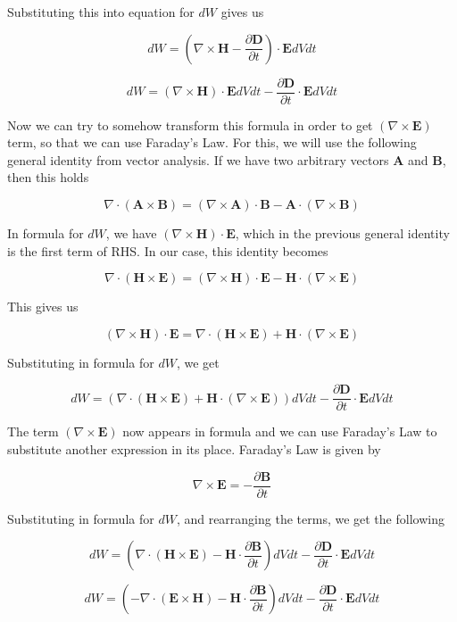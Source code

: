 \documentclass{article}
\begin{document}
Substituting this into equation for $dW$ gives us

\[ dW = (\nabla \times \mathbf{H} - \frac{\partial \mathbf{D}}{\partial t}) \cdot \mathbf{E} dVdt \]

\[ dW = (\nabla \times \mathbf{H}) \cdot \mathbf{E}dVdt - \frac{\partial \mathbf{D}}{\partial t} \cdot \mathbf{E}dVdt \]

Now we can try to somehow transform this formula in order to get $(\nabla \times \mathbf{E})$ term, so that we can use Faraday's Law. For this, we will use the following general identity from vector analysis. If we have two arbitrary vectors $\mathbf{A}$ and $\mathbf{B}$, then this holds

\[ \nabla \cdot (\mathbf{A} \times \mathbf{B}) = (\nabla \times \mathbf{A}) \cdot \mathbf{B} - \mathbf{A} \cdot (\nabla \times \mathbf{B}) \]

In formula for $dW$, we have $(\nabla \times \mathbf{H}) \cdot \mathbf{E}$, which in the previous general identity is the first term of RHS. In our case, this identity becomes

\[ \nabla \cdot (\mathbf{H} \times \mathbf{E}) = (\nabla \times \mathbf{H}) \cdot \mathbf{E} - \mathbf{H} \cdot (\nabla \times \mathbf{E}) \]

This gives us

\[ (\nabla \times \mathbf{H}) \cdot \mathbf{E} = \nabla \cdot (\mathbf{H} \times \mathbf{E}) + \mathbf{H} \cdot (\nabla \times \mathbf{E}) \]

Substituting in formula for $dW$, we get

\[ dW = (\nabla \cdot (\mathbf{H} \times \mathbf{E}) + \mathbf{H} \cdot (\nabla \times \mathbf{E}))dVdt - \frac{\partial \mathbf{D}}{\partial t} \cdot \mathbf{E}dVdt \]

The term $(\nabla \times \mathbf{E})$ now appears in formula and we can use Faraday's Law to substitute another expression in its place. Faraday's Law is given by

\[ \nabla \times \mathbf{E} = -\frac{\partial \mathbf{B}}{\partial t} \]

Substituting in formula for $dW$, and rearranging the terms, we get the following

\[ dW = (\nabla \cdot (\mathbf{H} \times \mathbf{E}) - \mathbf{H} \cdot \frac{\partial \mathbf{B}}{\partial t})dVdt - \frac{\partial \mathbf{D}}{\partial t} \cdot \mathbf{E}dVdt \]

\[ dW = (- \nabla \cdot (\mathbf{E} \times \mathbf{H}) - \mathbf{H} \cdot \frac{\partial \mathbf{B}}{\partial t})dVdt - \frac{\partial \mathbf{D}}{\partial t} \cdot \mathbf{E}dVdt \]
\end{document}
